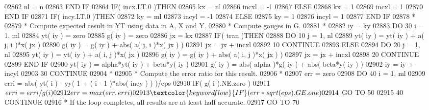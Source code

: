 \begin{DoxyCode}
02862          nl = n
02863 \textcolor{keywordflow}{      END IF}
02864       \textcolor{keywordflow}{IF}( incx.LT.0 )\textcolor{keywordflow}{THEN}
02865          kx = nl
02866          incxl = -1
02867       \textcolor{keywordflow}{ELSE}
02868          kx = 1
02869          incxl = 1
02870 \textcolor{keywordflow}{      END IF}
02871       \textcolor{keywordflow}{IF}( incy.LT.0 )\textcolor{keywordflow}{THEN}
02872          ky = ml
02873          incyl = -1
02874       \textcolor{keywordflow}{ELSE}
02875          ky = 1
02876          incyl = 1
02877 \textcolor{keywordflow}{      END IF}
02878 \textcolor{comment}{*}
02879 \textcolor{comment}{*     Compute expected result in YT using data in A, X and Y.}
02880 \textcolor{comment}{*     Compute gauges in G.}
02881 \textcolor{comment}{*}
02882       iy = ky
02883       \textcolor{keywordflow}{DO} 30 i = 1, ml
02884          yt( iy ) = zero
02885          g( iy ) = zero
02886          jx = kx
02887          \textcolor{keywordflow}{IF}( tran )\textcolor{keywordflow}{THEN}
02888             \textcolor{keywordflow}{DO} 10 j = 1, nl
02889                yt( iy ) = yt( iy ) + a( j, i )*x( jx )
02890                g( iy ) = g( iy ) + abs( a( j, i )*x( jx ) )
02891                jx = jx + incxl
02892    10       \textcolor{keywordflow}{CONTINUE}
02893          \textcolor{keywordflow}{ELSE}
02894             \textcolor{keywordflow}{DO} 20 j = 1, nl
02895                yt( iy ) = yt( iy ) + a( i, j )*x( jx )
02896                g( iy ) = g( iy ) + abs( a( i, j )*x( jx ) )
02897                jx = jx + incxl
02898    20       \textcolor{keywordflow}{CONTINUE}
02899 \textcolor{keywordflow}{         END IF}
02900          yt( iy ) = alpha*yt( iy ) + beta*y( iy )
02901          g( iy ) = abs( alpha )*g( iy ) + abs( beta*y( iy ) )
02902          iy = iy + incyl
02903    30 \textcolor{keywordflow}{CONTINUE}
02904 \textcolor{comment}{*}
02905 \textcolor{comment}{*     Compute the error ratio for this result.}
02906 \textcolor{comment}{*}
02907       err = zero
02908       \textcolor{keywordflow}{DO} 40 i = 1, ml
02909          erri = abs( yt( i ) - yy( 1 + ( i - 1 )*abs( incy ) ) )/eps
02910          \textcolor{keywordflow}{IF}( g( i ).NE.zero )
02911      $      erri = erri/g( i )
02912          err = max( err, erri )
02913          \textcolor{keywordflow}{IF}( err*sqrt( eps ).GE.one )
02914      $      \textcolor{keywordflow}{GO TO} 50
02915    40 \textcolor{keywordflow}{CONTINUE}
02916 \textcolor{comment}{*     If the loop completes, all results are at least half accurate.}
02917       \textcolor{keywordflow}{GO TO} 70

\end{DoxyCode}
